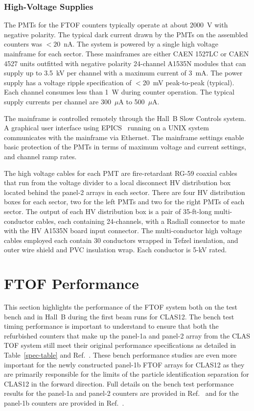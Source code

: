 \documentclass{elsart}
\begin{document}
\subsubsection{High-Voltage Supplies}

The PMTs for the FTOF counters typically operate at about 2000~V with negative polarity. The typical
dark current drawn by the PMTs on the assembled counters was $<20$~nA. The system is powered by a
single high voltage mainframe for each sector. These mainframes are either CAEN 1527LC or CAEN 4527
units outfitted with negative polarity 24-channel A1535N modules that can supply up to 3.5~kV per channel
with a maximum current of 3~mA. The power supply has a voltage ripple specification of $<$20~mV
peak-to-peak (typical). Each channel consumes less than 1~W during counter operation. The typical supply
currents per channel are 300~$\mu$A to 500~$\mu$A.

The mainframe is controlled remotely through the Hall~B Slow Controls system. A graphical user interface
using EPICS~\cite{epics} running on a UNIX system communicates with the mainframe via Ethernet. The
mainframe settings enable basic protection of the PMTs in terms of maximum voltage and current settings,
and channel ramp rates.

The high voltage cables for each PMT are fire-retardant RG-59 coaxial cables that run from the voltage
divider to a local disconnect HV distribution box located behind the panel-2 arrays in each sector. There
are four HV distribution boxes for each sector, two for the left PMTs and two for the right PMTs of
each sector. The output of each HV distribution box is a pair of 35-ft-long multi-conductor cables, each
containing 24-channels, with a Radiall connector to mate with the HV A1535N board input connector. The
multi-conductor high voltage cables employed each contain 30 conductors wrapped in Tefzel insulation, and
outer wire shield and PVC insulation wrap. Each conductor is 5-kV rated.

\section{FTOF Performance}
\label{sec:performance}

This section highlights the performance of the FTOF system both on the test bench and in Hall~B
during the first beam runs for CLAS12. The bench test timing performance is important to
understand to ensure that both the refurbished counters that make up the panel-1a and panel-2
array from the CLAS TOF system still meet their original performance specifications as detailed
in Table~\ref{spec-table} and Ref.~\cite{tof-nim}. These bench performance studies are even more
important for the newly constructed panel-1b FTOF arrays for CLAS12 as they are primarily
responsible for the limits of the particle identification separation for CLAS12 in the forward direction.
Full details on the bench test performance results for the panel-1a and panel-2 counters are provided
in Ref.~\cite{dsc-cn2013-001} and for the panel-1b counters are provided in Ref.~\cite{nim-p1b}.
\end{document}
